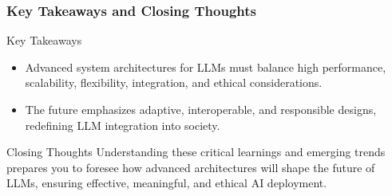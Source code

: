 \documentclass[aspectratio=169]{beamer}
\begin{document}
\begin{frame}[fragile]
    \frametitle{Key Takeaways and Closing Thoughts}
    
    \begin{block}{Key Takeaways}
        \begin{itemize}
            \item Advanced system architectures for LLMs must balance high performance, scalability, flexibility, integration, and ethical considerations.
            \item The future emphasizes adaptive, interoperable, and responsible designs, redefining LLM integration into society.
        \end{itemize}
    \end{block}
    
    \begin{block}{Closing Thoughts}
        Understanding these critical learnings and emerging trends prepares you to foresee how advanced architectures will shape the future of LLMs, ensuring effective, meaningful, and ethical AI deployment.
    \end{block}
\end{frame}
\end{document}
